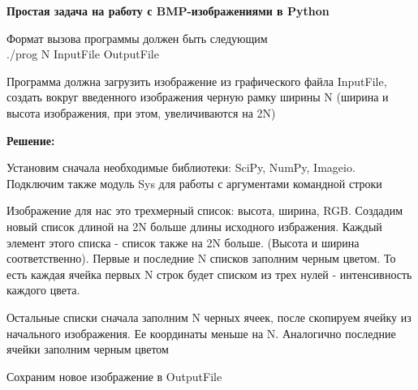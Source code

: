 \documentclass{article}
\begin{document}
\begin{center}
\Large\bf Простая задача на работу с BMP-изображениями в Python
\end{center}

Формат вызова программы должен быть следующим\\
./prog N InputFile OutputFile

Программа должна загрузить изображение из графического файла InputFile, создать вокруг введенного изображения черную рамку ширины N (ширина и высота изображения, при этом, увеличиваются на 2N)

{\large\bf Решение:}

Установим сначала необходимые библиотеки: SciPy, NumPy, Imageio. Подключим также модуль Sys для работы с аргументами командной строки

Изображение для нас это трехмерный список: высота, ширина, RGB. Создадим новый список длиной на 2N больше длины исходного избражения. Каждый элемент этого списка - список также на 2N больше. (Высота и ширина соответственно).
Первые и последние N списков заполним черным цветом. То есть каждая ячейка первых N строк будет списком из трех нулей - интенсивность каждого цвета.

Остальные списки сначала заполним N черных ячеек, после скопируем ячейку из начального изображения. Ее координаты меньше на N. Аналогично последние ячейки заполним черным цветом

Сохраним новое изображение в OutputFile
\end{document}

